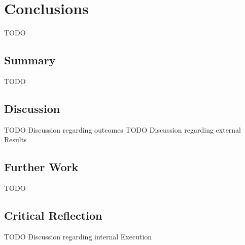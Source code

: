 \chapter{Conclusions}
\label{chap:concl}

TODO

\section{Summary}

TODO

\section{Discussion}

TODO Discussion regarding outcomes
TODO Discussion regarding external Results

\section{Further Work}

TODO

\section{Critical Reflection}

TODO  Discussion regarding internal Execution